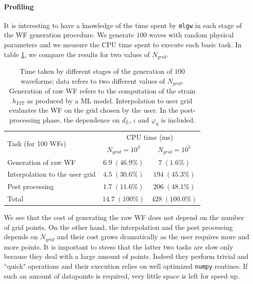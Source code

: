 \paragraph{Profiling}
It is interesting to have a knowledge of the time spent by \texttt{mlgw} in each stage of the WF generation procedure.
We generate $100$ waves with random physical parameters and we measure the CPU time spent to execute each basic task.
In table \ref{tab:profiling}, we compare the results for two values of $N_{grid}$.
\begin{table}
	\def\arraystretch{1.5}
	\begin{tabular}{ l c c }
		\multirow{2}{*}{Task (for 100 WFs)}& \multicolumn{2}{c}{CPU time (ms)}\\
			&$N_{grid} = 10^3$	& $N_{grid} = 10^5$\\
	\hline \hline
		 Generation of raw WF 			& $6.9 \; (46.9\%)$	& $7 \; (1.6\%)$ \\ 
	\hline
		 Interpolation to the user grid & $4.5 \; (30.6\%)$	& $194 \; (45.3\%)$ \\ 
	\hline
		 Post processing 				& $1.7 \; (11.6\%)$	& $206 \; (48.1\%)$ \\
	\hline
		 Total							& $14.7 \; (100\%)$ &  $428 \; (100.0\%)$ \\
	\hline \hline
	\end{tabular}
	\caption{
Time taken by different stages of the generation of $100$ waveforms; data refers to two different values of $N_{grid}$.
Generation of raw WF refers to the computation of the strain $h_{FIT}$ as produced by a ML model. 
Interpolation to user grid evaluates the WF on the grid chosen by the user. In the post-processing phase, the dependence on $d_L$, $\iota$ and $\varphi_0$ is included.
}
	\label{tab:profiling}
\end{table}
\par
We see that the cost of generating the raw WF does not depend on the number of grid points. 
On the other hand, the interpolation and the post processing depends on $N_{grid}$ and their 
cost grows dramatically as the user requires more and more points. It is important to stress that 
the latter two tasks are slow only because they deal with a large amount of points. Indeed they perform 
trivial and ``quick" operations and their execution relies on well optimized \texttt{numpy} routines.
If such an amount of datapoints is required, very little space is left for speed up.


